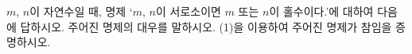 $m$, $n$이 자연수일 때, 명제 `$m$, $n$이 서로소이면 $m$ 또는 $n$이 홀수이다.'에 대하여 다음에 답하시오.
 주어진 명제의 대우를 말하시오.
 (1)을 이용하여 주어진 명제가 참임을 증명하시오.
